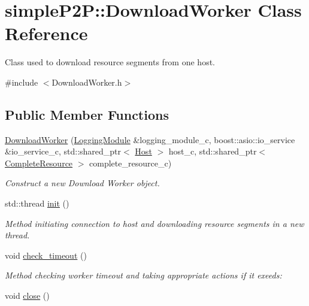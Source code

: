 \hypertarget{classsimpleP2P_1_1DownloadWorker}{}\section{simple\+P2P\+:\+:Download\+Worker Class Reference}
\label{classsimpleP2P_1_1DownloadWorker}


Class used to download resource segments from one host.  




{\ttfamily \#include $<$Download\+Worker.\+h$>$}

\subsection*{Public Member Functions}
\begin{DoxyCompactItemize}
\item 
\hyperlink{classsimpleP2P_1_1DownloadWorker_a2861145541d88a86bf3b082e5272d1d8}{Download\+Worker} (\hyperlink{classsimpleP2P_1_1LoggingModule}{Logging\+Module} \&logging\+\_\+module\+\_\+c, boost\+::asio\+::io\+\_\+service \&io\+\_\+service\+\_\+c, std\+::shared\+\_\+ptr$<$ \hyperlink{classsimpleP2P_1_1Host}{Host} $>$ host\+\_\+c, std\+::shared\+\_\+ptr$<$ \hyperlink{classsimpleP2P_1_1CompleteResource}{Complete\+Resource} $>$ complete\+\_\+resource\+\_\+c)
\begin{DoxyCompactList}\small\item\em Construct a new Download Worker object. \end{DoxyCompactList}\item 
std\+::thread \hyperlink{classsimpleP2P_1_1DownloadWorker_aedf77c7a4944beaee84494c83512551b}{init} ()
\begin{DoxyCompactList}\small\item\em Method initiating connection to host and downloading resource segments in a new thread. \end{DoxyCompactList}\item 
void \hyperlink{classsimpleP2P_1_1DownloadWorker_a03f21eb4f4d1a1e3e87f983ff5e389f7}{check\+\_\+timeout} ()
\begin{DoxyCompactList}\small\item\em Method checking worker timeout and taking appropriate actions if it exeeds\+: \end{DoxyCompactList}\item 
void \hyperlink{classsimpleP2P_1_1DownloadWorker_ae975a4408ee3e8f85c0a067732dd44f0}{close} ()

\end{DoxyCompactItemize}
